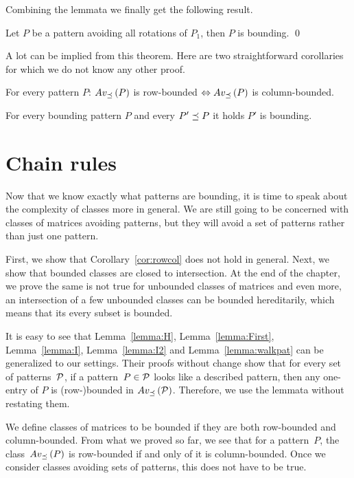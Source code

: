 Combining the lemmata we finally get the following result.

\begin{thm}
Let $P$ be a pattern avoiding all rotations of $P_1$, then $P$ is bounding. \qed
\end{thm}

A lot can be implied from this theorem. Here are two straightforward corollaries for which we do not know any other proof.

\begin{cor}
\label{cor:rowcol}
For every pattern $P$: $Av_{\preceq}\left(P\right)$ is row-bounded $\Leftrightarrow Av_{\preceq}\left(P\right)$ is column-bounded.
\end{cor}

\begin{cor}
For every bounding pattern $P$ and every $P'\preceq P$ it holds $P'$ is bounding.
\end{cor}

\section{Chain rules}
Now that we know exactly what patterns are bounding, it is time to speak about the complexity of classes more in general. We are still going to be concerned with classes of matrices avoiding patterns, but they will avoid a set of patterns rather than just one pattern.

First, we show that Corollary~\ref{cor:rowcol} does not hold in general. Next, we show that bounded classes are closed to intersection. At the end of the chapter, we prove the same is not true for unbounded classes of matrices and even more, an intersection of a few unbounded classes can be bounded hereditarily, which means that its every subset is bounded.

It is easy to see that Lemma~\ref{lemma:H}, Lemma~\ref{lemma:First}, Lemma~\ref{lemma:I}, Lemma~\ref{lemma:I2} and Lemma~\ref{lemma:walkpat} can be generalized to our settings. Their proofs without change show that for every set of patterns~$\mathcal{P}$, if a pattern~$P\in\mathcal{P}$ looks like a described pattern, then any one-entry of $P$ is (row-)bounded in $Av_{\preceq}\left(\mathcal{P}\right)$. Therefore, we use the lemmata without restating them.

We define classes of matrices to be bounded if they are both row-bounded and column-bounded. From what we proved so far, we see that for a pattern~$P$, the class~$Av_{\preceq}\left(P\right)$ is row-bounded if and only of it is column-bounded. Once we consider classes avoiding sets of patterns, this does not have to be true.

